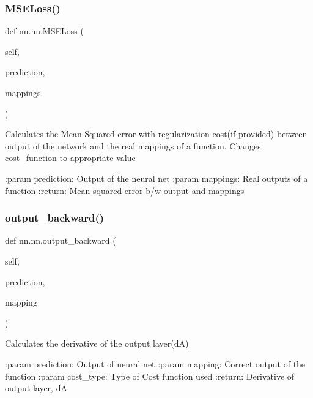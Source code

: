 \subsubsection{\texorpdfstring{M\+S\+E\+Loss()}{MSELoss()}}
{\footnotesize\ttfamily def nn.\+nn.\+M\+S\+E\+Loss (\begin{DoxyParamCaption}\item[{}]{self,  }\item[{}]{prediction,  }\item[{}]{mappings }\end{DoxyParamCaption})}

\begin{DoxyVerb}Calculates the Mean Squared error with regularization cost(if provided) between output of the network and the real
mappings of a function.
Changes cost_function to appropriate value

:param prediction: Output of the neural net
:param mappings: Real outputs of a function
:return: Mean squared error b/w output and mappings
\end{DoxyVerb}
 \mbox{\label{classnn_1_1nn_afa7d1462872fae95fe71f27ed00bf7ae}} 
\subsubsection{\texorpdfstring{output\+\_\+backward()}{output\_backward()}}
{\footnotesize\ttfamily def nn.\+nn.\+output\+\_\+backward (\begin{DoxyParamCaption}\item[{}]{self,  }\item[{}]{prediction,  }\item[{}]{mapping }\end{DoxyParamCaption})}

\begin{DoxyVerb}Calculates the derivative of the output layer(dA)

:param prediction: Output of neural net
:param mapping: Correct output of the function
:param cost_type: Type of Cost function used
:return: Derivative of output layer, dA  
\end{DoxyVerb}
 \mbox{\label{classnn_1_1nn_aa5d886ef2ff91c73160129eb16d63d78}} 

